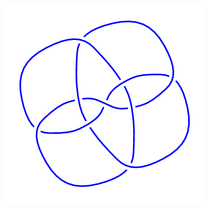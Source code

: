 \begin{figure}[H]
\begin{minipage}[b]{.18\linewidth}
	\end{minipage}
	\begin{minipage}[b]{.18\linewidth}
		\centering
		\includegraphics[width=\linewidth]{../data/9_40.png}
	\end{minipage}
\end{figure}
